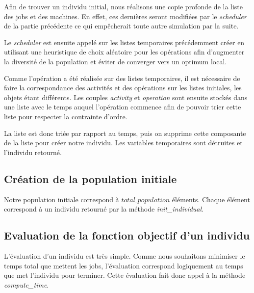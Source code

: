 Afin de trouver un individu initial, nous réalisons une copie profonde de la liste des jobs et des machines. En effet, ces dernières seront modifiées par le \textit{scheduler} de la partie précédente ce qui empêcherait toute autre simulation par la suite. 



Le \textit{scheduler} est ensuite appelé sur les listes temporaires précédemment créer en utilisant une heuristique de choix aléatoire pour les opérations afin d'augmenter la diversité de la population et éviter de converger vers un optimum local.



Comme l'opération a été réalisée sur des listes temporaires, il est nécessaire de faire la correspondance des activités et des opérations sur les listes initiales, les objets étant différents. Les couples \textit{activity} et \textit{operation} sont ensuite stockés dans une liste avec le temps auquel l'opération commence afin de pouvoir trier cette liste pour respecter la contrainte d'ordre.



La liste est donc triée par rapport au temps, puis on supprime cette composante de la liste pour créer notre individu. Les variables temporaires sont détruites et l'individu retourné.

\subsection{Création de la population initiale}



Notre population initiale correspond à $total\_population$ éléments. Chaque élément correspond à un individu retourné par la méthode \textit{init\_individual}.

\subsection{Evaluation de la fonction objectif d'un individu}



L'évaluation d'un individu est très simple. Comme nous souhaitons minimiser le temps total que mettent les jobs, l'évaluation correspond logiquement au temps que met l'individu pour terminer. Cette évaluation fait donc appel à la méthode \textit{compute\_time}. 

